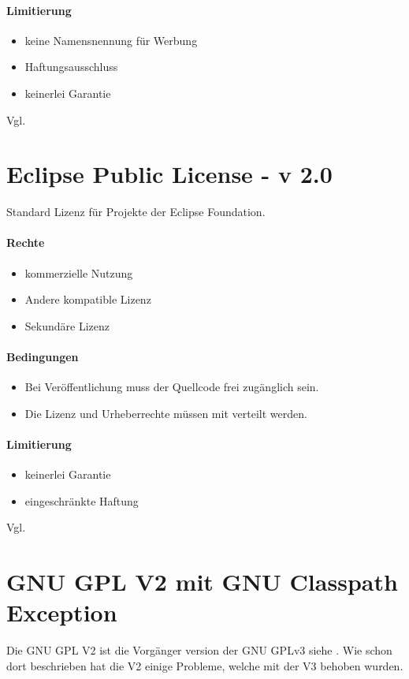 \paragraph{Limitierung}
\begin{itemize}
    \item keine Namensnennung für Werbung
    \item Haftungsausschluss
    \item keinerlei Garantie
\end{itemize}

Vgl. \cite{bsd-3-clause}

\section{Eclipse Public License - v 2.0}
Standard Lizenz für Projekte der Eclipse Foundation.

\paragraph{Rechte}
\begin{itemize}
    \item kommerzielle Nutzung
    \item Andere kompatible Lizenz
    \item Sekundäre Lizenz
\end{itemize}
\paragraph{Bedingungen}
\begin{itemize}
    \item Bei Veröffentlichung muss der Quellcode frei zugänglich sein.
    \item Die Lizenz und Urheberrechte müssen mit verteilt werden.
\end{itemize}

\paragraph{Limitierung}
\begin{itemize}
    \item keinerlei Garantie
    \item eingeschränkte Haftung
\end{itemize}

Vgl. \cite{epl-2}

\section{GNU GPL V2 mit GNU Classpath Exception}\label{sec:gnu-gpl-v2-mit-gnu-classpath-exception}
Die GNU GPL V2 ist die Vorgänger version der GNU GPLv3 siehe .
Wie schon dort beschrieben hat die V2 einige Probleme, welche mit der V3 behoben wurden.

